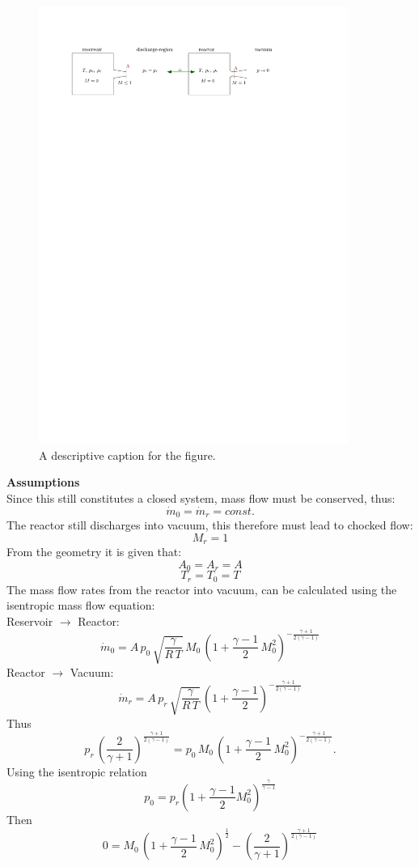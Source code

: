 \begin{figure}[H]
    \centering
    \includegraphics[width=0.9\textwidth]{src/03_analytical-work/fig_disconnected-reservoirs.pdf}
    \caption{A descriptive caption for the figure.}
    \label{fig:disconnected-reservoirs}
\end{figure}

\textbf{Assumptions}\\
Since this still constitutes a closed system, mass flow must be conserved, thus:
$$
	\dot{m}_0 = \dot{m}_r = const.
$$
The reactor still discharges into vacuum, this therefore must lead to chocked flow:
$$
	M_r = 1
$$
From the geometry it is given that:
$$
	A_0 = A_r = A
$$
$$
	T_r = T_0 = T
$$
\newpage
\noindent The mass flow rates from the reactor into vacuum, can be calculated using the isentropic mass flow equation:\\
Reservoir $\to$ Reactor:
$$
	\dot{m}_0 = A\, p_0\, \sqrt{\frac{\gamma}{R\,T}}\, M_0\,\left(1+\frac{\gamma-1}{2}\,M_0^2\right)^{-\frac{\gamma+1}{2(\gamma-1)}}
$$
Reactor $\to$ Vacuum:
$$
	\dot{m}_r = A\, p_r\, \sqrt{\frac{\gamma}{R\,T}}\,\left(1+\frac{\gamma-1}{2}\right)^{-\frac{\gamma+1}{2(\gamma-1)}}
$$
Thus
$$
	p_r\, \left(\frac{2}{\gamma+1}\right)^{\frac{\gamma+1}{2(\gamma-1)}}
	= p_0\, M_0\,\left(1+\frac{\gamma-1}{2}\,M_0^2\right)^{-\frac{\gamma+1}{2(\gamma-1)}}.
$$
Using the isentropic relation
$$
	p_0 = p_r \left(1 + \frac{\gamma - 1}{2} M_0^2\right)^{\frac{\gamma}{\gamma - 1}}
$$
Then
$$
	0 = 
	M_0\,\left(1+\frac{\gamma-1}{2}\,M_0^2\right)^{\frac{1}{2}}
	- \left(\frac{2}{\gamma+1}\right)^{\frac{\gamma+1}{2(\gamma-1)}}
$$
